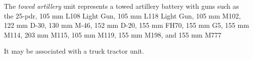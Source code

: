 
The \emph{towed artillery} unit represents a towed artillery battery with guns such as the 
25-pdr,
105 mm L108 Light Gun, 
105 mm L118 Light Gun, 
105 mm M102, 
122 mm D-30, 
130 mm M-46,
152 mm D-20,
155 mm FH70, 
155 mm G5, 
155 mm M114, 
203 mm M115,
105 mm M119, 
155 mm M198, 
and
155 mm M777

It may be associated with a truck tractor unit.
